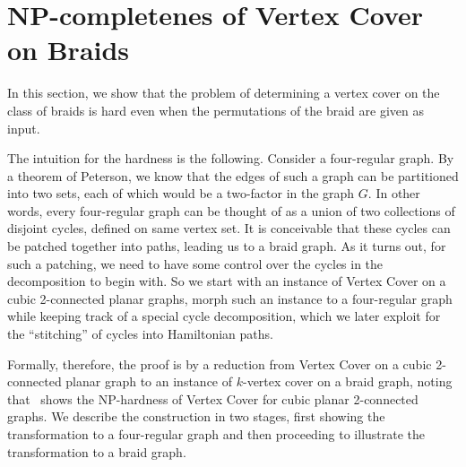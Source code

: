 \documentclass[svgnames]{llncs}
\newcommand{\braid}{braid}
\newcommand{\Braid}{Braid}
\begin{document}
\section{NP-completenes of Vertex Cover on \Braid{}s}


In this section, we show that the problem of determining a vertex cover on the class of \braid{}s is hard even when the permutations of the \braid{} are given as input. 

The intuition for the hardness is the following. Consider a four-regular graph. By a theorem of Peterson, we know that the edges of such a graph can be partitioned into two sets, each of which would
be a two-factor in the graph $G$. In other words, every four-regular graph can be thought of as a union of two collections of disjoint cycles, defined on same vertex set. It is conceivable
that these cycles can be patched together into paths, leading us to a braid graph. As it turns out, for such a patching, we need to have some control over the cycles in the decomposition to begin with. 
So we start with an instance of Vertex Cover on a cubic 2-connected planar graphs, morph such an instance to a four-regular graph while keeping track of a special cycle decomposition, which 
we later exploit for the ``stitching'' of cycles into Hamiltonian paths. 

Formally, therefore, the proof is by a reduction from Vertex Cover on a cubic 2-connected planar graph to an instance of $k$-vertex cover on a \braid{} graph, noting that~\cite{Mohar2001102} shows the NP-hardness of 
Vertex Cover for cubic planar 2-connected graphs. We describe the construction in two stages, first showing the transformation to a four-regular graph and then proceeding to illustrate the transformation to a braid graph. 
\end{document}
